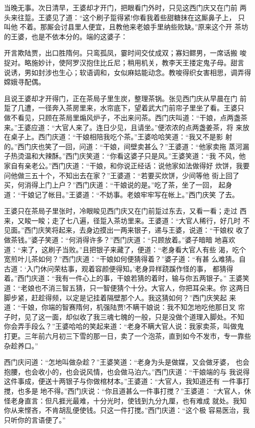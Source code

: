 当晚无事。次日清早，王婆却才开门，把眼看门外时，只见这西门庆又在门前
两头来往踅。王婆见了道：“这个刷子踅得紧!你看我着些甜糖抹在这厮鼻子上，
只叫他不着。那厮会讨县里人便宜，且教他来老娘手里纳些败缺。”原来这个开
茶坊的王婆，也是不依本分的。端的这婆子：

开言欺陆贾，出口胜隋何。只鸾孤凤，霎时间交仗成双；寡妇鳏男，一席话搬
唆捉对。略施妙计，使阿罗汉抱住比丘尼；稍用机关，教李天王搂定鬼子母。甜言
说诱，男如封涉也生心；软语调和，女似麻姑能动念。教唆得织女害相思，调弄得
嫦娥寻配偶。

且说王婆却才开得门，正在茶局子里生炭，整理茶锅。张见西门庆从早晨在门
前踅了几遭，一径奔入茶房里来，水帘底下，望着武大门前帘子里坐了看。王婆只
做不看见，只顾在茶局里煽风炉子，不出来问茶。西门庆叫道：“干娘，点两盏茶
来。”王婆应道：“大官人来了。连日少见，且请坐。”便浓浓的点两盏姜茶，将
来放在桌子上。西门庆道：“干娘相陪我吃个茶。”王婆哈哈笑道：“我又不是影
射的。”西门庆也笑了一回，问道：“干娘，间壁卖甚么？”王婆道：“他家卖拖
蒸河漏子热烫温和大辣酥。”西门庆笑道：“你看这婆子只是风。”王婆笑道：“我
不风，他家自有亲老公。”西门庆道：“干娘，和你说正经话：说他家如法做得好
炊饼，我要问他做三五十个，不知出去在家？”王婆道：“若要买炊饼，少间等他
街上回了买，何消得上门上户？”西门庆道：“干娘说的是。”吃了茶，坐了一回，
起身道：“干娘记了帐目。”王婆道：“不妨事。老娘牢牢写在帐上。”西门庆笑
了去。

王婆只在茶局子里张时，冷眼睃见西门庆又在门前踅过东去，又看一看；走过
西来，又睃一睃；走了七八遍，径踅入茶坊里来。王婆道：“大官人稀行，好几时
不见面。”西门庆笑将起来，去身边摸出一两来银子，递与王婆，说道：“干娘权
收了做茶钱。”婆子笑道：“何消得许多？”西门庆道：“只顾放着。”婆子暗暗
地喜欢道：“来了，这刷子当败。”且把银子来藏了，便道：“老身看大官人有些
渴，吃个宽煎叶儿茶如何？”西门庆道：“干娘如何便猜得着？”婆子道：“有甚
么难猜。自古道：‘入门休问荣枯事，观着容颜便得知。’老身异样跷蹊作怪的事，
都猜得着。”西门庆道：“我有一件心上的事，干娘若猜的着时，输与你五两银子。”
王婆笑道：“老娘也不消三智五猜，只一智便猜个十分。大官人，你把耳朵来。你
这两日脚步紧，赶趁得频，以定是记挂着隔壁那个人。我这猜如何？”西门庆笑起
来道：“干娘，你端的智赛隋何，机强陆贾!不瞒干娘说：我不知怎地吃他那日叉
帘子时，见了这一面，却似收了我三魂七魄的一般，只是没做个道理入脚处。不知
你会弄手段么？”王婆哈哈的笑起来道：“老身不瞒大官人说：我家卖茶，叫做鬼
打更。三年前六月初三下雪的那一日，卖了一个泡茶，直到如今不发市，专一靠些
杂趁养口。”

西门庆问道：“怎地叫做杂趁？”王婆笑道：“老身为头是做媒，又会做牙婆，
也会抱腰，也会收小的，也会说风情，也会做马泊六。”西门庆道：“干娘端的与
我说得这件事成，便送十两银子与你做棺材本。”王婆道：“大官人，我知道还有
一件事打搅，也多是地不得。”西门庆说：“你且道甚么一件事打搅？”王婆道：
“大官人，休怪老身直言：但凡捱光最难，十分光时，使钱到九分九厘，也有难成
就处。我知你从来悭吝，不肯胡乱便使钱。只这一件打搅。”西门庆道：“这个极
容易医治，我只听你的言语便了。”

